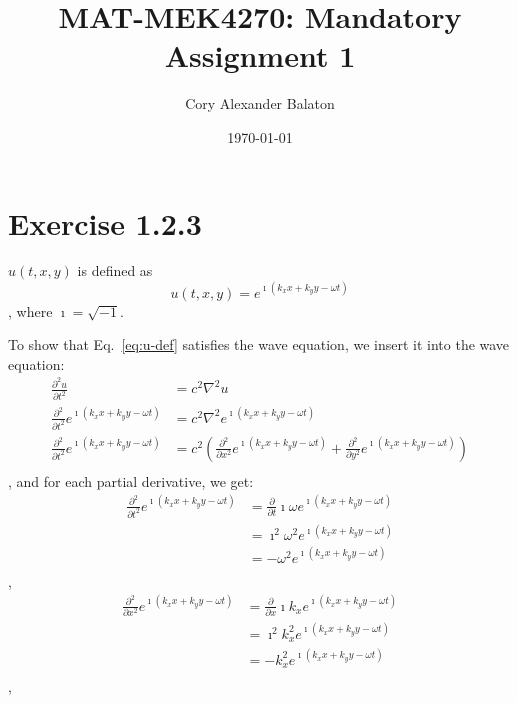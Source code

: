 \documentclass[12pt, a4paper]{article}
\title{MAT-MEK4270: Mandatory Assignment 1}
\author{Cory Alexander Balaton}
\date{\today}
\begin{document}
\maketitle 
\newpage

\section*{Exercise 1.2.3}

$u(t,x,y)$ is defined as
\begin{equation}
    u(t,x,y) = e^{ \imath (k_x x + k_y y - \omega t)}
    \label{eq:u-def}
\end{equation},
%
where $\imath = \sqrt{-1}$.

To show that Eq.~\ref{eq:u-def} satisfies the wave equation, we insert it 
into the wave equation:
\begin{align*}
    \frac{\partial^2 u}{\partial t^2} &= c^2 \nabla^2 u \\
    \frac{\partial^2 }{\partial t^2} e^{ \imath (k_x x + k_y y - \omega t)} 
        &= c^2 \nabla^2 e^{ \imath (k_x x + k_y y - \omega t)} \\
    \frac{\partial^2 }{\partial t^2} e^{ \imath (k_x x + k_y y - \omega t)} 
        &= c^2 \left( \frac{\partial^2}{\partial x^2} e^{ \imath (k_x x + k_y y - \omega t)}
                    + \frac{\partial^2}{\partial y^2} e^{ \imath (k_x x + k_y y - \omega t)} \right) \\
\end{align*},
and for each partial derivative, we get:
\begin{align*}
    \frac{\partial^2 }{\partial t^2} e^{ \imath (k_x x + k_y y - \omega t)} 
        &= \frac{\partial }{\partial t} \imath \omega e^{ \imath (k_x x + k_y y - \omega t)} \\ 
        &= \imath^2 \omega^2 e^{ \imath (k_x x + k_y y - \omega t)} \\ 
        &= - \omega^2 e^{ \imath (k_x x + k_y y - \omega t)} \\ 
\end{align*},
\begin{align*}
    \frac{\partial^2 }{\partial x^2} e^{ \imath (k_x x + k_y y - \omega t)} 
        &= \frac{\partial }{\partial x} \imath k_x e^{ \imath (k_x x + k_y y - \omega t)} \\ 
        &= \imath^2 k_x^2 e^{ \imath (k_x x + k_y y - \omega t)} \\ 
        &= - k_x^2 e^{ \imath (k_x x + k_y y - \omega t)} \\ 
\end{align*},
\end{document}

